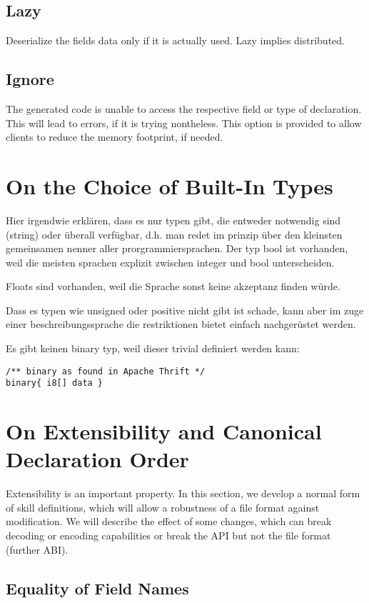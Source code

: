 \documentclass[a4paper,10pt]{article}
\begin{document}
\subsection*{Lazy}
Deserialize the fields data only if it is actually used. Lazy implies distributed.

\subsection*{Ignore}
The generated code is unable to access the respective field or type of declaration. This will lead to errors, if it is trying nontheless. This option is provided to allow clients to reduce the memory footprint, if needed.

\section{On the Choice of Built-In Types}

Hier irgendwie erklären, dass es nur typen gibt, die entweder notwendig sind (string) oder überall verfügbar, d.h. man redet im prinzip über den kleinsten gemeinsamen nenner aller prorgrammiersprachen. Der typ bool ist vorhanden, weil die meisten sprachen explizit zwischen integer und bool unterscheiden.

Floats sind vorhanden, weil die Sprache sonst keine akzeptanz finden würde.

Dass es typen wie unsigned oder positive nicht gibt ist schade, kann aber im zuge einer beschreibungssprache die restriktionen bietet einfach nachgerüstet werden.

Es gibt keinen binary typ, weil dieser trivial definiert werden kann:
\begin{verbatim}
/** binary as found in Apache Thrift */
binary{ i8[] data }
\end{verbatim}


\section{On Extensibility and Canonical Declaration Order}

Extensibility is an important property. In this section, we develop a normal form of skill definitions, which will allow a robustness of a file format against modification. We will describe the effect of some changes, which can break decoding or encoding capabilities or break the API but not the file format (further ABI).

\subsection{Equality of Field Names}
\end{document}
